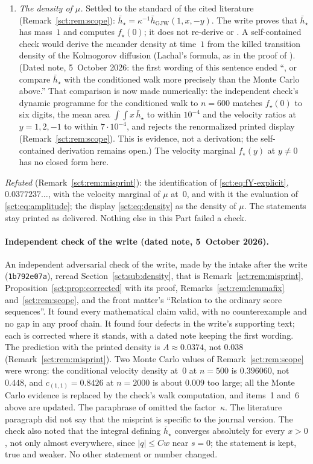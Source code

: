 \documentclass[11pt,letterpaper]{article}
\theoremstyle{definition}\newtheorem{remark}[theorem]{Remark}
\newcommand{\hstar}{\bar h_\star}\newcommand{\fstar}{f_\star}\newcommand{\Kstar}{K_\star}
\begin{document}
\begin{enumerate}
\item \emph{The density of $\mu$.} Settled to the standard of the cited literature (Remark~\ref{sct:rem:scope}): $\hstar=\kappa^{-1}\bar h_{\mathrm{GJW}}(1,x,-y)$. The write proves that $\hstar$ has mass~$1$ and computes $\fstar(0)$; it does not re-derive \cite[(2.24)]{gjw} or \cite[Lemma~16]{dw}. A self-contained check would derive the meander density at time~$1$ from the killed transition density of the Kolmogorov diffusion (Lachal's formula, as in the proof of \cite[Lemma~16]{dw}). (Dated note, 5~October 2026: the first wording of this sentence ended ``, or compare $\hstar$ with the conditioned walk more precisely than the Monte Carlo above.'' That comparison is now made numerically: the independent check's dynamic programme for the conditioned walk to $n=600$ matches $\fstar(0)$ to six digits, the mean area $\int\!\!\int x\,\hstar$ to within $10^{-4}$ and the velocity ratios at $y=1,2,-1$ to within $7\cdot10^{-4}$, and rejects the renormalized printed display (Remark~\ref{sct:rem:scope}). This is evidence, not a derivation; the self-contained derivation remains open.) The velocity marginal $\fstar(y)$ at $y\ne0$ has no closed form here.
\end{enumerate}
\emph{Refuted} (Remark~\ref{sct:rem:misprint}): the identification of \eqref{sct:eq:fY-explicit}, $0.0377237\ldots$, with the velocity marginal of $\mu$ at~$0$, and with it the evaluation of \eqref{sct:eq:amplitude}; the display \eqref{sct:eq:density} as the density of $\mu$. The statements stay printed as delivered. Nothing else in this Part failed a check.

\paragraph{Independent check of the write (dated note, 5~October 2026).}
An independent adversarial check of the write, made by the intake after the write (\texttt{1b792e07a}), reread Section~\ref{sct:sub:density}, that is Remark~\ref{sct:rem:misprint}, Proposition~\ref{sct:prop:corrected} with its proof, Remarks~\ref{sct:rem:lemmafix} and~\ref{sct:rem:scope}, and the front matter's ``Relation to the ordinary score sequences''. It found every mathematical claim valid, with no counterexample and no gap in any proof chain. It found four defects in the write's supporting text; each is corrected where it stands, with a dated note keeping the first wording. The prediction with the printed density is $A\approx0.0374$, not $0.038$ (Remark~\ref{sct:rem:misprint}). Two Monte Carlo values of Remark~\ref{sct:rem:scope} were wrong: the conditional velocity density at~$0$ at $n=500$ is $0.396060$, not $0.448$, and $c_{(1,1)}=0.8426$ at $n=2000$ is about $0.009$ too large; all the Monte Carlo evidence is replaced by the check's walk computation, and items~1 and~6 above are updated. The paraphrase of \cite[Lemma~16]{dw} omitted the factor~$\kappa$. The literature paragraph did not say that the misprint is specific to the journal version. The check also noted that the integral defining $\hstar$ converges absolutely for every $x>0$, not only almost everywhere, since $|q|\le Cw$ near $s=0$; the statement is kept, true and weaker. No other statement or number changed.
\end{document}

